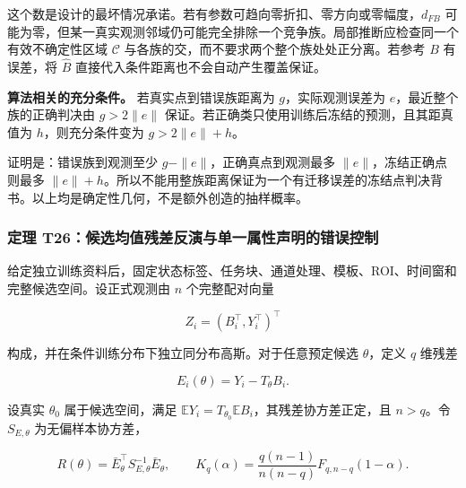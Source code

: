 \documentclass[11pt,a4paper]{article}
\begin{document}
这个数是设计的最坏情况承诺。若有参数可趋向零折扣、零方向或零幅度，\(d_{FB}\)
可能为零，但某一真实观测邻域仍可能完全排除一个竞争族。局部推断应检查同一个有效不确定性区域
\(\mathcal C\) 与各族的交，而不要求两个整个族处处正分离。若参考 \(B\)
有误差，将 \(\widehat B\) 直接代入条件距离也不会自动产生覆盖保证。

\textbf{算法相关的充分条件。} 若真实点到错误族距离为
\(g\)，实际观测误差为 \(e\)，最近整个族的正确判决由 \(g>2\|e\|\)
保证。若正确类只使用训练后冻结的预测，且其距真值为 \(h\)，则充分条件变为
\(g>2\|e\|+h\)。

证明是：错误族到观测至少 \(g-\|e\|\)，正确真点到观测最多
\(\|e\|\)，冻结正确点则最多
\(\|e\|+h\)。所以不能用整族距离保证为一个有迁移误差的冻结点判决背书。以上均是确定性几何，不是额外创造的抽样概率。

\subsubsection{定理
T26：候选均值残差反演与单一属性声明的错误控制}\label{ux5b9aux7406-t26ux5019ux9009ux5747ux503cux6b8bux5deeux53cdux6f14ux4e0eux5355ux4e00ux5c5eux6027ux58f0ux660eux7684ux9519ux8befux63a7ux5236}

\par
\noindent\begin{minipage}{\linewidth}

给定独立训练资料后，固定状态标签、任务块、通道处理、模板、ROI、时间窗和完整候选空间。设正式观测由
\(n\) 个完整配对向量

\[
Z_i=(B_i^\top,Y_i^\top)^\top
\]

\end{minipage}\par

\par
\noindent\begin{minipage}{\linewidth}

构成，并在条件训练分布下独立同分布高斯。对于任意预定候选
\(\theta\)，定义 \(q\) 维残差

\[
E_i(\theta)=Y_i-T_\theta B_i.
\]

\end{minipage}\par

\par
\noindent\begin{minipage}{\linewidth}

设真实 \(\theta_0\) 属于候选空间，满足
\(\mathbb E Y_i=T_{\theta_0}\mathbb E B_i\)，其残差协方差正定，且
\(n>q\)。令 \(S_{E,\theta}\) 为无偏样本协方差，

\[
R(\theta)=\bar E_\theta^\top S_{E,\theta}^{-1}\bar E_\theta,
\qquad
K_q(\alpha)=\frac{q(n-1)}{n(n-q)}F_{q,n-q}(1-\alpha).
\]

\end{minipage}\par
\end{document}
